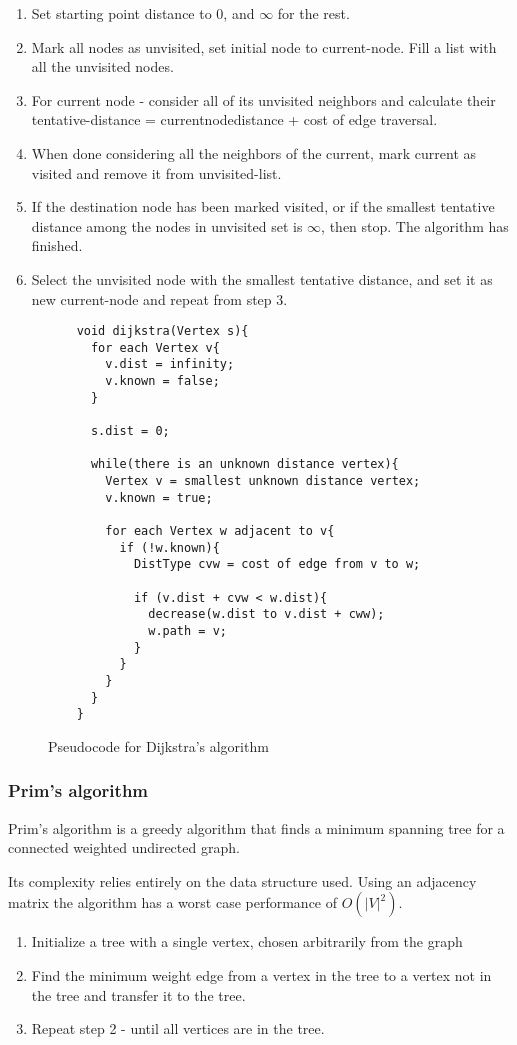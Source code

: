 \documentclass[paper=a4, fontsize=11pt]{scrartcl}
\numberwithin{equation}{section} %
\numberwithin{figure}{section} %
\numberwithin{table}{section} %
\theoremstyle{definition}
\begin{document}
\begin{enumerate}
  \item Set starting point distance to 0, and \(\infty\) for the rest.
  \item Mark all nodes as unvisited, set initial node to current-node. Fill a list with all the unvisited nodes.
  \item For current node - consider all of its unvisited neighbors and calculate their tentative-distance = currentnodedistance + cost of edge traversal.
  \item When done considering all the neighbors of the current, mark current as visited and remove it from unvisited-list.
  \item If the destination node has been marked visited, or if the smallest tentative distance among the nodes in unvisited set is \(\infty\), then stop. The algorithm has finished.
  \item Select the unvisited node with the smallest tentative distance, and set it as new current-node and repeat from step 3.
\end{enumerate}

\begin{figure}[p]
  \begin{verbatim}
    void dijkstra(Vertex s){
      for each Vertex v{
        v.dist = infinity;
        v.known = false;
      }
      
      s.dist = 0;

      while(there is an unknown distance vertex){
        Vertex v = smallest unknown distance vertex;
        v.known = true;
        
        for each Vertex w adjacent to v{
          if (!w.known){
            DistType cvw = cost of edge from v to w;

            if (v.dist + cvw < w.dist){
              decrease(w.dist to v.dist + cww);
              w.path = v;
            }
          }
        }
      }
    }
  \end{verbatim}
  \caption{Pseudocode for Dijkstra's algorithm}
  \label{dijkalg}
\end{figure}
\subsubsection{Prim's algorithm}
Prim's algorithm is a greedy algorithm that finds a minimum spanning tree for a
connected weighted undirected graph.

Its complexity relies entirely on the data structure used. Using an adjacency matrix the algorithm has a worst case performance of \(O\left(|V|^2\right)\).
\begin{enumerate}
  \item Initialize a tree with a single vertex, chosen arbitrarily from the graph
  \item Find the minimum weight edge from a vertex in the tree to a vertex not in the tree and transfer it to the tree.
  \item Repeat step 2 - until all vertices are in the tree.
\end{enumerate}
\end{document}
